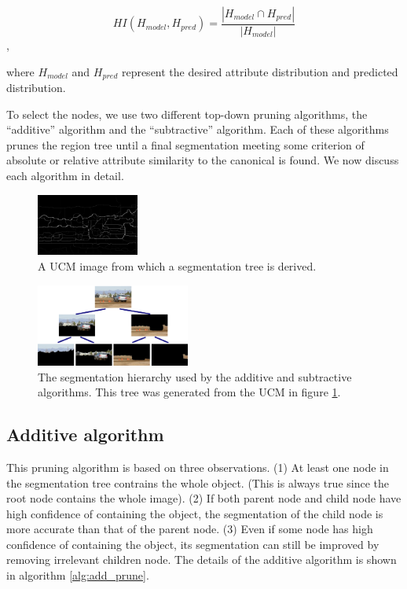 \documentclass[10pt,twocolumn,letterpaper]{article}
\begin{document}
\[ HI(H_{model},H_{pred}) = \frac{|H_{model} \cap H_{pred}|}{|H_{model}|}
\] ,

where $H_{model}$ and $H_{pred}$ represent the desired attribute
distribution and predicted distribution.

To select the nodes, we use two different top-down pruning algorithms, 
the ``additive'' algorithm and the ``subtractive'' algorithm. 
Each of these algorithms prunes the region tree until a final segmentation
meeting some criterion of absolute or relative attribute similarity to the canonical is found.
We now discuss each algorithm in detail.

\begin{figure}
\centering
\includegraphics[width=0.30\textwidth]{figures/2008_000052_ucm.bmp.eps}
\caption{A UCM image from which a segmentation tree is derived.}
\label{fig:ucm}
\end{figure}

\begin{figure}
\centering
\includegraphics[width=0.45\textwidth]{figures/tree_additive.eps}
\caption{The segmentation hierarchy used by the additive
and subtractive algorithms.  This tree was generated from the UCM
in figure \ref{fig:ucm}.}
\label{fig:tree}
\end{figure}

\subsection{Additive algorithm}
\label{ssec:additive}

This pruning algorithm is based on three observations. (1) At least
one node in the segmentation tree contrains the whole object. (This
is always true since the root node contains the whole image). (2) If
both parent node and child node have high confidence of containing
the object, the segmentation of the child node is more accurate than
that of the parent node. (3) Even if some node has high confidence
of containing the object, its segmentation can still be improved by
removing irrelevant children node. The details of the additive
algorithm is shown in algorithm \ref{alg:add_prune}.
\end{document}
